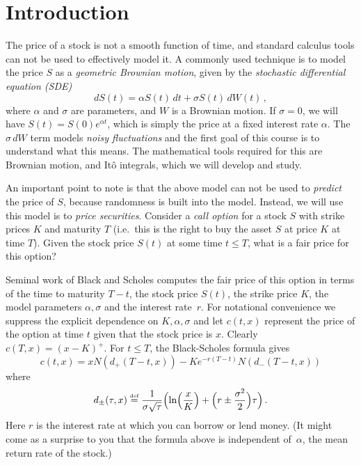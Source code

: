 
\chapter{Introduction}

The price of a stock is not a smooth function of time, and standard calculus tools can not be used to effectively model it.
A commonly used technique is to model the price $S$ as a \emph{geometric Brownian motion}, given by the \emph{stochastic differential equation (SDE)}
\begin{equation*}
  dS(t) = \alpha S(t) \, dt + \sigma S(t) \, dW(t)\,,
\end{equation*}
where $\alpha$ and $\sigma$ are parameters, and $W$ is a Brownian motion.
If $\sigma = 0$, we will have $S(t) = S(0) e^{\alpha t}$, which is simply the price at a fixed interest rate $\alpha$.
The $\sigma \, dW$ term models \emph{noisy fluctuations} and the first goal of this course is to understand what this means.
The mathematical tools required for this are Brownian motion, and It\^o integrals, which we will develop and study.

An important point to note is that the above model can not be used to \emph{predict} the price of $S$, because randomness is built into the model.
Instead, we will use this model is to \emph{price securities}.
Consider a \emph{call option} for a stock $S$ with strike prices $K$ and maturity $T$ (i.e.\ this is the right to buy the asset $S$ at price $K$ at time $T$).
Given the stock price $S(t)$ at some time $t \leq T$, what is a fair price for this option?

Seminal work of Black and Scholes computes the fair price of this option in terms of the time to maturity $T - t$, the stock price $S(t)$, the strike price $K$, the model parameters $\alpha, \sigma$ and the interest rate~$r$.
For notational convenience we suppress the explicit dependence on $K, \alpha, \sigma$ and let $c(t, x)$ represent the price of the option at time $t$ given that the stock price is $x$.
Clearly $c(T, x) = (x - K)^+$.
For $t \leq T$, the Black-Scholes formula gives
\begin{equation*}
  c(t, x) = x N( d_+(T - t, x) ) - Ke^{-r (T-t)} N( d_-(T-t, x) )
\end{equation*}
where
\begin{equation*}
  d_\pm( \tau, x ) \defeq
    \frac{1}{\sigma \sqrt{\tau}}\paren[\Big]{
	\ln\paren[\Big]{\frac{x}{K}}
	+ \paren[\Big]{ r \pm \frac{\sigma^2}{2} } \tau
      }\,.
\end{equation*}
Here $r$ is the interest rate at which you can borrow or lend money.
(It might come as a surprise to you that the formula above is independent of~$\alpha$, the mean return rate of the stock.)

